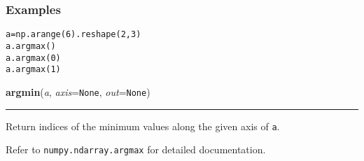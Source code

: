 \begin{boxedminipage}{\textwidth}

\hypertarget{examples}{}
\subsubsection*{Examples}
\begin{alltt}
\pysrcprompt{{\textgreater}{\textgreater}{\textgreater} }a = np.arange(6).reshape(2,3)
\pysrcprompt{{\textgreater}{\textgreater}{\textgreater} }a.argmax()
\pysrcoutput{}\pysrcprompt{{\textgreater}{\textgreater}{\textgreater} }a.argmax(0)
\pysrcoutput{}\pysrcprompt{{\textgreater}{\textgreater}{\textgreater} }a.argmax(1)
\end{alltt}
    \vspace{1ex}

    \end{boxedminipage}

    \label{numpy:ndarray:argmin}

    \vspace{0.5ex}

    \begin{boxedminipage}{\textwidth}

    \raggedright \textbf{argmin}(\textit{a}, \textit{axis}=\texttt{None}, \textit{out}=\texttt{None})

    \vspace{-1.5ex}

    \rule{\textwidth}{0.5\fboxrule}

Return indices of the minimum values along the given axis of \texttt{a}.

Refer to \texttt{numpy.ndarray.argmax} for detailed documentation.
    \vspace{1ex}

    \end{boxedminipage}

    \label{numpy:ndarray:argsort}

    \vspace{0.5ex}

